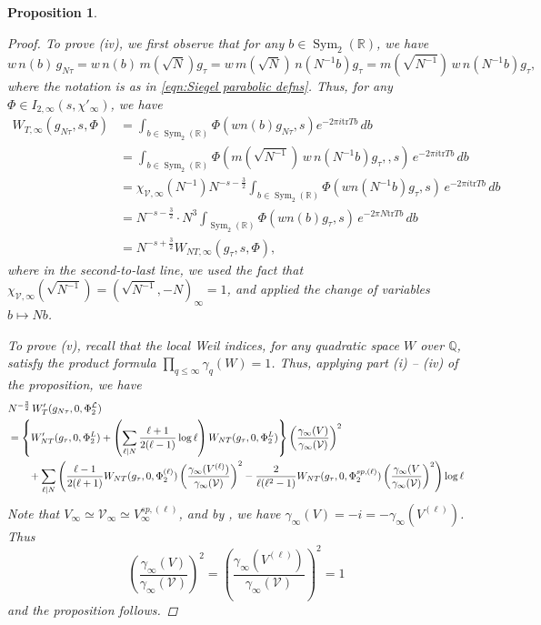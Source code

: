 \documentclass[reqno,oneside]{amsart}
\theoremstyle{plain}
\newtheorem{proposition}[theorem]{Proposition}
\theoremstyle{remark}
\numberwithin{theorem}{section}
\newcommand{\bbQ}{\mathbb Q}
\newcommand{\bbR}{\mathbb R}
\newcommand{\calL}{\mathcal L}
\newcommand{\calV}{\mathcal V}
\DeclareMathOperator{\Sym}{Sym}
\begin{document}
\begin{proposition}
\begin{proof}
			To prove \textit{(iv)}, we first observe that for any $b \in \Sym_2(\bbR)$, we have
			\begin{equation}
			w \, n(b) \, g_{N\tau} =  w\, n(b) \, m(\sqrt{N}) g_{\tau} = w \, m(\sqrt{N}) \, n( N^{-1} b) g_{\tau} = m(\sqrt{N^{-1}})\, w \, n(N^{-1}b) g_{\tau},
			\end{equation}
			where the notation is as in \eqref{eqn:Siegel parabolic defns}.
			Thus, for any $\Phi \in I_{2,\infty}(s, \chi'_{\infty})$, we have
			\begin{align}
			W_{T, \infty }(g_{N\tau}, s, \Phi) & = \int_{b \in \Sym_2(\bbR)} \Phi(w n(b) g_{N\tau},s) e^{-2 \pi i \mathrm{tr} Tb} \,  db \\
			& = \int_{b \in \Sym_2(\bbR)} \Phi(m(\sqrt{N^{-1}})\, w \, n(N^{-1}b) g_{\tau},, s) \, e^{-2 \pi i \mathrm{tr} Tb} \, db \\
			&= \chi_{\calV, \infty}(N^{-1}) N^{-s - \frac32}  \int_{b \in \Sym_2(\bbR)} \Phi(w n(N^{-1}b)   g_{\tau}, s) \, e^{-2 \pi i \mathrm{tr} Tb} \, db \\
			&=  N^{-s - \frac32} \cdot N^3  \int_{\Sym_2(\bbR)}  \Phi(w n(b) g_{\tau}, s) \, e^{-2 \pi N \mathrm{tr} Tb} \, db \\
			&= N^{-s + \frac32} W_{NT, \infty}(g_{\tau}, s, \Phi),
			\end{align}
			where in the second-to-last line, we used the fact that $\chi_{\calV, \infty}(\sqrt{N^{-1}}) = (\sqrt{N^{-1}}, - N)_{\infty} = 1$, and applied the change of variables $b \mapsto Nb$.
			
			To prove \textit{(v)}, recall that the local Weil indices, for any quadratic space $W$ over $\bbQ$, satisfy the product formula $\prod_{q \leq \infty} \gamma_q(W)  = 1$. Thus, applying part \textit{(i) -- (iv)} of the proposition, we have
			\begin{align}
			&N^{-\frac32} \,	W'_T (g_{N\tau}, 0, \Phi^{\calL}_2) \notag \\
			&= \left\{ W_{NT}'(g_{\tau}, 0, \Phi^L_2)   + \left( \sum_{\ell|N}  \frac{\ell + 1}{2(\ell - 1)} \log \ell \right) W_{NT}(g_{\tau}, 0, \Phi^L_2) \right\}  \left( \frac{ \gamma_{\infty}(V)}{\gamma_{\infty}(\calV)} \right)^2 \notag\\
			& \qquad + \sum_{\ell|N} \left(  \frac{\ell-1}{2(\ell+1)} W_{NT}(g_{\tau}, 0, \Phi_2^{(\ell)})  \left( \frac{ \gamma_{\infty}(V^{(\ell)})}{\gamma_{\infty}(\calV)} \right)^2 - \frac{2}{\ell(\ell^2-1)} W_{NT}(g_{\tau}, 0, \Phi^{sp,(\ell)}_2) \left( \frac{ \gamma_{\infty}(V}{\gamma_{\infty}(\calV)} \right)^2	\right) \log \ell	
			\end{align}
			Note that $V_{\infty} \simeq \calV_{\infty} \simeq V^{sp, (\ell)}_{\infty}$, and by \cite[p.\ 330]{KRYbook}, we have $\gamma_{\infty}(V) = -i = - \gamma_{\infty}(V^{(\ell)})$. Thus
			\begin{equation}
			\left( \frac{ \gamma_{\infty}(V)}{\gamma_{\infty}(\calV)} \right)^2 = \left( \frac{ \gamma_{\infty}(V^{(\ell)})}{\gamma_{\infty}(\calV)} \right)^2 = 1
			\end{equation}
			and the proposition follows.
		\end{proof}
	\end{proposition}
	
\end{document}
